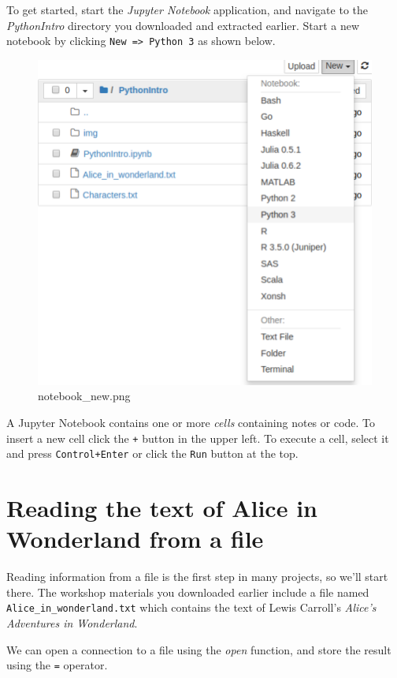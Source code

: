 \documentclass[]{book}
\begin{document}
To get started, start the \emph{Jupyter Notebook} application, and
navigate to the \emph{PythonIntro} directory you downloaded and
extracted earlier. Start a new notebook by clicking
\texttt{New\ =\textgreater{}\ Python\ 3} as shown below.

\begin{figure}
\centering
\includegraphics{Python/PythonIntro/images/notebook_new.png}
\caption{notebook\_new.png}
\end{figure}

A Jupyter Notebook contains one or more \emph{cells} containing notes or
code. To insert a new cell click the \texttt{+} button in the upper
left. To execute a cell, select it and press \texttt{Control+Enter} or
click the \texttt{Run} button at the top.

\section{Reading the text of Alice in Wonderland from a
file}\label{reading-the-text-of-alice-in-wonderland-from-a-file}

Reading information from a file is the first step in many projects, so
we'll start there. The workshop materials you downloaded earlier include
a file named \texttt{Alice\_in\_wonderland.txt} which contains the text
of Lewis Carroll's \emph{Alice's Adventures in Wonderland}.

We can open a connection to a file using the \emph{open} function, and
store the result using the \texttt{=} operator.
\end{document}
